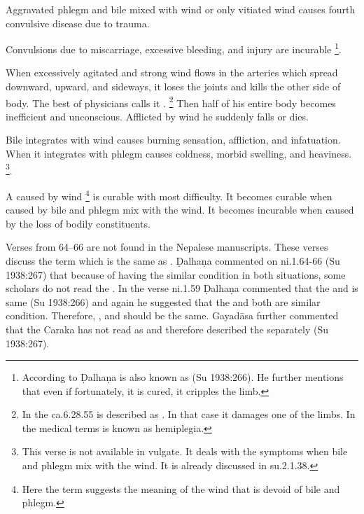 \begin{translation}
{\item[58] Aggravated phlegm and bile mixed with wind or only vitiated wind causes fourth convulsive disease due to trauma.

\item[59] Convulsions due to miscarriage, excessive bleeding, and injury are 
incurable \footnote{According to Ḍalhaṇa  is also 
known as 
 (Su 1938:266). He further mentions that even if fortunately, it is 
cured, it cripples the limb.}.

\item[60--62] When excessively agitated and strong wind flows in the arteries 
which spread downward, upward, and sideways, it loses the joints and kills the 
other side of body. The best of physicians calls it . 
\footnote{In the ca.6.28.55  is described as 
. In that case it damages one of the limbs.  In the 
medical terms  is known as hemiplegia.} Then half 
of his entire body becomes inefficient and unconscious. Afflicted by wind he 
suddenly falls or dies.

\item[62.1] Bile integrates with wind causes burning sensation, affliction, and infatuation. When it integrates with phlegm causes coldness, morbid swelling, and heaviness. \footnote{This verse is not available in vulgate. It deals with the symptoms when bile and phlegm mix with the wind. It is already discussed in su.2.1.38.}. 

\item[63] A  caused by wind \footnote{Here the term 
 suggests the meaning of the wind that is devoid of bile and 
phlegm.} is curable with most difficulty. It becomes curable when caused by bile 
and phlegm mix with the wind. It becomes incurable when caused by the loss of 
bodily constituents.

\item[64--66] Verses from 64--66 are not found in the Nepalese manuscripts. 
These verses discuss the term  
which is the same as . Ḍalhaṇa commented on ni.1.64-66 (Su 
1938:267) that because of having the similar condition in both situations, some 
scholars do not read the . In the verse ni.1.59 Ḍalhaṇa 
commented that the  and  is same (Su 1938:266) and 
again he suggested that the  and  both are similar 
condition. Therefore, ,  and  should be 
the same. Gayadāsa further commented that the Caraka has not read 
 as  and therefore described the  
separately (Su 1938:267).

}
\end{translation}

